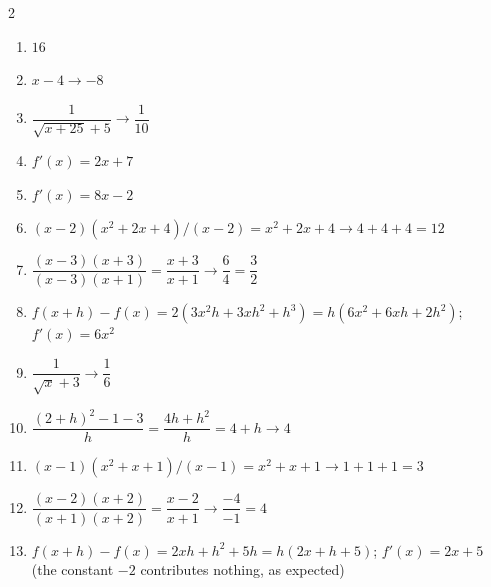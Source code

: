 \documentclass[11pt]{article}
\begin{document}
\begin{keybox}
\begin{multicols}{2}
\small
\begin{enumerate}[leftmargin=*,itemsep=3pt]
  \item $16$
  \item $x-4\to-8$
  \item $\dfrac{1}{\sqrt{x+25}+5}\to\dfrac1{10}$
  \item $f'(x)=2x+7$
  \item $f'(x)=8x-2$
  \item $(x-2)(x^2+2x+4)/(x-2)=x^2+2x+4\to4+4+4=12$
  \item $\dfrac{(x-3)(x+3)}{(x-3)(x+1)}=\dfrac{x+3}{x+1}\to\dfrac64=\dfrac32$
  \item $f(x+h)-f(x)=2(3x^2h+3xh^2+h^3)=h(6x^2+6xh+2h^2)$; $f'(x)=6x^2$
  \item $\dfrac{1}{\sqrt x+3}\to\dfrac16$
  \item $\dfrac{(2+h)^2-1-3}{h}=\dfrac{4h+h^2}h=4+h\to4$
  \item $(x-1)(x^2+x+1)/(x-1)=x^2+x+1\to1+1+1=3$
  \item $\dfrac{(x-2)(x+2)}{(x+1)(x+2)}=\dfrac{x-2}{x+1}\to\dfrac{-4}{-1}=4$
  \item $f(x+h)-f(x)=2xh+h^2+5h=h(2x+h+5)$; $f'(x)=2x+5$ (the constant $-2$ contributes nothing, as expected)
\end{enumerate}
\end{multicols}
\end{keybox}
\end{document}
